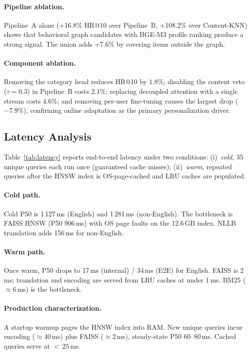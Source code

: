 \paragraph{Pipeline ablation.}
Pipeline~A alone (+16.8\% HR@10 over Pipeline~B, +108.2\% over Content-KNN)
shows that behavioral graph candidates with BGE-M3 profile ranking produce
a strong signal. The union adds +7.6\% by covering items outside the graph.

\paragraph{Component ablation.}
Removing the category head reduces HR@10 by $1.8\%$; disabling the content
veto ($\tau=0.3$) in Pipeline~B costs $2.1\%$; replacing decoupled attention
with a single stream costs $4.6\%$; and removing per-user fine-tuning causes
the largest drop ($-7.9\%$), confirming online adaptation as the primary
personalization driver.



\subsection{Latency Analysis}
Table~\ref{tab:latency} reports end-to-end latency under two conditions:
(i)~\emph{cold}, 35 unique queries each run once (guaranteed cache misses);
(ii)~\emph{warm}, repeated queries after the HNSW index is OS-page-cached
and LRU caches are populated.



\paragraph{Cold path.}
Cold P50 is 1\,127\,ms (English) and 1\,281\,ms (non-English).
The bottleneck is FAISS HNSW (P50 906\,ms) with OS page faults on the
12.6\,GB index. NLLB translation adds 156\,ms for non-English.

\paragraph{Warm path.}
Once warm, P50 drops to 17\,ms (internal) / 34\,ms (E2E) for English.
FAISS is 2\,ms; translation and encoding are served from LRU caches
at under 1\,ms. BM25 (${\approx}6$\,ms) is the bottleneck.

\paragraph{Production characterization.}
A startup warmup pages the HNSW index into RAM. New unique queries
incur encoding (${\approx}40$\,ms) plus FAISS (${\approx}2$\,ms),
steady-state P50 60--80\,ms. Cached queries serve at ${<}\,25$\,ms.


